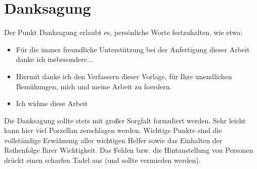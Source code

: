 \chapter*{Danksagung}
Der Punkt Danksagung erlaubt es, persönliche Worte festzuhalten, wie etwa:
\begin{itemize}
	\item Für die immer freundliche Unterstützung bei der Anfertigung dieser Arbeit danke ich insbesondere...
	\item Hiermit danke ich den Verfassern dieser Vorlage, für Ihre unendlichen Bemühungen, mich und meine Arbeit zu foerdern.
	\item Ich widme diese Arbeit 
\end{itemize}
Die Danksagung sollte stets mit großer Sorgfalt formuliert werden. Sehr leicht kann hier viel Porzellan zerschlagen werden. Wichtige Punkte sind die vollständige Erwähnung aller wichtigen Helfer sowie das Einhalten der Reihenfolge Ihrer Wichtigkeit. Das Fehlen bzw. die Hintanstellung von Personen drückt einen scharfen Tadel aus (und sollte vermieden werden).


